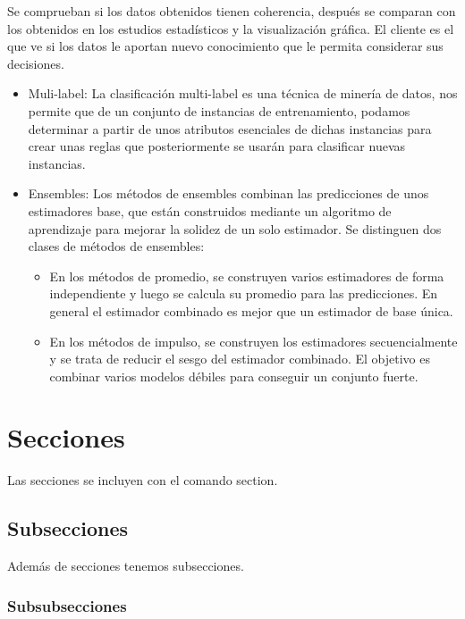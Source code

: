 Se comprueban si los datos obtenidos tienen coherencia, después se comparan con los obtenidos en los estudios estadísticos y la visualización gráfica. El cliente es el que ve si los datos le aportan nuevo conocimiento que le permita considerar sus decisiones.

\begin{itemize}
\item Muli-label: La clasificación multi-label es una técnica de minería de datos, nos permite que de un conjunto de instancias de entrenamiento, podamos determinar a partir de unos atributos esenciales de dichas instancias para crear unas reglas que posteriormente se usarán para clasificar nuevas instancias.    

\item Ensembles: Los métodos de ensembles combinan las predicciones de unos estimadores base, que están construidos mediante un algoritmo de aprendizaje para mejorar la solidez de un solo estimador.
Se distinguen dos clases de métodos de ensembles:
	\begin{itemize}
		\item En los métodos de promedio, se construyen varios estimadores de forma independiente y luego se calcula su promedio para las predicciones. En general el estimador combinado es mejor que un estimador de base única.
		\item En los métodos de impulso, se construyen los estimadores secuencialmente y se trata de reducir el sesgo del estimador combinado. El objetivo es combinar varios modelos débiles para conseguir un conjunto fuerte.
	\end{itemize}

\end{itemize}





\section{Secciones}

Las secciones se incluyen con el comando section.

\subsection{Subsecciones}

Además de secciones tenemos subsecciones.

\subsubsection{Subsubsecciones}

